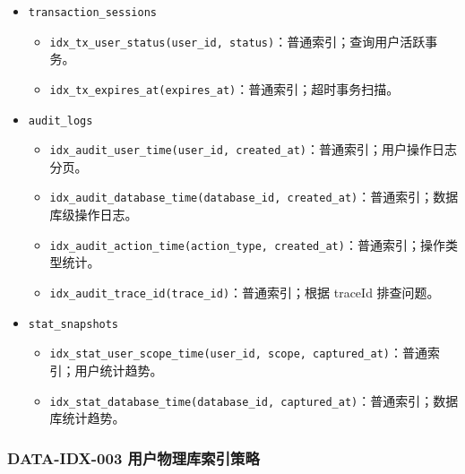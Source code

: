 \documentclass[
  a4paper,
  UTF8]{ctexart}
\providecommand{\tightlist}{%
  \setlength{\itemsep}{0pt}\setlength{\parskip}{0pt}}
\begin{document}
\begin{itemize}
  \begin{itemize}
  \tightlist
  \item
    \texttt{uk\_user\_databases\_schema\_name(schema\_name)}：唯一索引；真实物理库名唯一。
  \item
    \texttt{uk\_user\_databases\_user\_display\_status(user\_id,\ display\_name,\ status)}：唯一索引；同一用户同一状态下数据库显示名唯一。
  \item
    \texttt{idx\_user\_databases\_user\_status\_time(user\_id,\ status,\ created\_at)}：普通索引；查询当前用户有效数据库并按创建时间排序。
  \end{itemize}
\item
  \texttt{transaction\_sessions}

  \begin{itemize}
  \tightlist
  \item
    \texttt{idx\_tx\_user\_status(user\_id,\ status)}：普通索引；查询用户活跃事务。
  \item
    \texttt{idx\_tx\_expires\_at(expires\_at)}：普通索引；超时事务扫描。
  \end{itemize}
\item
  \texttt{audit\_logs}

  \begin{itemize}
  \tightlist
  \item
    \texttt{idx\_audit\_user\_time(user\_id,\ created\_at)}：普通索引；用户操作日志分页。
  \item
    \texttt{idx\_audit\_database\_time(database\_id,\ created\_at)}：普通索引；数据库级操作日志。
  \item
    \texttt{idx\_audit\_action\_time(action\_type,\ created\_at)}：普通索引；操作类型统计。
  \item
    \texttt{idx\_audit\_trace\_id(trace\_id)}：普通索引；根据 traceId
    排查问题。
  \end{itemize}
\item
  \texttt{stat\_snapshots}

  \begin{itemize}
  \tightlist
  \item
    \texttt{idx\_stat\_user\_scope\_time(user\_id,\ scope,\ captured\_at)}：普通索引；用户统计趋势。
  \item
    \texttt{idx\_stat\_database\_time(database\_id,\ captured\_at)}：普通索引；数据库统计趋势。
  \end{itemize}
\end{itemize}

\hypertarget{data-idx-003-ux7528ux6237ux7269ux7406ux5e93ux7d22ux5f15ux7b56ux7565}{%
\subsubsection{DATA-IDX-003
用户物理库索引策略}\label{data-idx-003-ux7528ux6237ux7269ux7406ux5e93ux7d22ux5f15ux7b56ux7565}}
\end{document}
